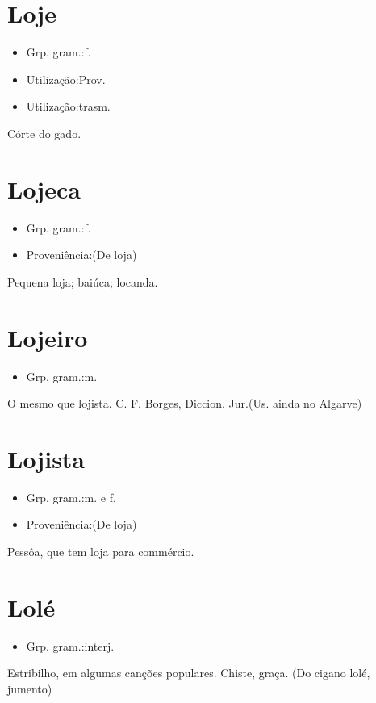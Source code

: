 \section{Loje}
\begin{itemize}
\item {Grp. gram.:f.}
\end{itemize}
\begin{itemize}
\item {Utilização:Prov.}
\end{itemize}
\begin{itemize}
\item {Utilização:trasm.}
\end{itemize}
Córte do gado.
\section{Lojeca}
\begin{itemize}
\item {Grp. gram.:f.}
\end{itemize}
\begin{itemize}
\item {Proveniência:(De \textunderscore loja\textunderscore )}
\end{itemize}
Pequena loja; baiúca; locanda.
\section{Lojeiro}
\begin{itemize}
\item {Grp. gram.:m.}
\end{itemize}
O mesmo que \textunderscore lojista\textunderscore . C. F. Borges, \textunderscore Diccion. Jur.\textunderscore  (Us. ainda no Algarve)
\section{Lojista}
\begin{itemize}
\item {Grp. gram.:m.  e  f.}
\end{itemize}
\begin{itemize}
\item {Proveniência:(De loja)}
\end{itemize}
Pessôa, que tem loja para commércio.
\section{Lolé}
\begin{itemize}
\item {Grp. gram.:interj.}
\end{itemize}
Estribilho, em algumas canções populares.
Chiste, graça.
(Do cigano \textunderscore lolé\textunderscore , jumento)

